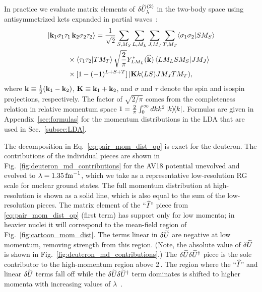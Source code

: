 \documentclass[10pt,aps,prc,floatfix,twocolumn,nofootinbib]{revtex4-1}
\begin{document}
In practice we evaluate matrix elements of $\delta \widetilde U^{(2)}_\lambda$ in the two-body space using antisymmetrized kets expanded in partial waves~\cite{Dickhoff:2005text}:
%
\begin{align}
    \label{eq:pw_ket}
   & \ket{\kvec_1 \sg1 \ta1 \, \kvec_2\sg2\ta2}  = 
    \frac{1}{\sqrt{2}} \sum_{S,M_S}\sum_{L,M_L}\sum_{J,M_J}\sum_{T,M_T}\!
    \braket{\sg1 \sg2}{S M_S} \notag \\
    & \qquad\quad \null\times \braket{\ta1 \ta2}{T M_T} 
    \sqrt{\frac{2}{\pi}}Y^*_{LM_L}(\khat) \braket{L M_L S M_S}{J M_J} \notag \\
    & \qquad\quad \null \times
    [1 - (-1)^{L+S+T}]\,
    |\Kvec k (LS) J M_J T M_T) ,
\end{align}
%
%
where 
$\mathbf{k} \equiv \frac{1}{2}(\mathbf{k}_1 - \mathbf{k}_2)$, $\mathbf{K} \equiv \mathbf{k}_1 + \mathbf{k}_2$,
and $\sigma$ and $\tau$ denote the spin and isospin projections, respectively.
The factor of $\sqrt{2/\pi}$ comes from the completeness relation in relative momentum space $1 = \frac{2}{\pi} \int_0^{\infty} dk k^2 \ketbra{k}{k}$.
Formulas are given in Appendix~\ref{sec:formulas} for the momentum distributions in the LDA that are used in Sec.~\ref{subsec:LDA}.

The decomposition in Eq.~\eqref{eq:pair_mom_dist_op} is exact for the deuteron. The contributions of the individual pieces are shown in Fig.~\ref{fig:deuteron_md_contributions} for the AV18 potential unevolved and evolved to $\lambda = 1.35\,\mbox{fm}^{-1}$, which we take as a representative low-resolution RG scale for nuclear ground states.
The full momentum distribution at high-resolution is shown as a solid line, which is also equal to the sum of the low-resolution pieces.
The matrix element of the ``$\widehat I$'' piece from \eqref{eq:pair_mom_dist_op} (first term) has support only for low momenta; in heavier nuclei it will correspond to the mean-field region of Fig.~\ref{fig:cartoon_mom_dist}.
The terms linear in $\delta \widetilde U$ are negative at low momentum, removing strength from this region.
(Note, the absolute value of $\delta \widetilde U$ is shown in Fig.~\ref{fig:deuteron_md_contributions}.)
The $\delta \widetilde U\delta \widetilde U^{\dagger}$ piece is the sole contributor to the high-momentum region above 2\,\fmi.
The region where the ``$\widehat I$'' and linear $\delta \widetilde U$ terms fall off while the $\delta \widetilde U\delta \widetilde U^{\dagger}$ term dominates is shifted to higher momenta with increasing values of $\lambda$~\cite{Tropiano:2021prep}.
\end{document}
